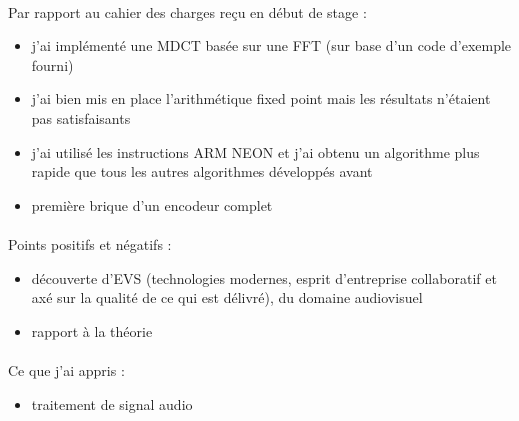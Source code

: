 \documentclass{article}
\begin{document}
    \paragraph{}
    Par rapport au cahier des charges reçu en début de stage :
    \begin{itemize}
        \item j'ai implémenté une MDCT basée sur une FFT (sur base d'un code d'exemple fourni)
        \item j'ai bien mis en place l'arithmétique fixed point mais les résultats n'étaient pas satisfaisants
        \item j'ai utilisé les instructions ARM NEON et j'ai obtenu un algorithme plus rapide que tous les autres algorithmes développés avant
        \item première brique d'un encodeur complet
    \end{itemize}

    \paragraph{}
    Points positifs et négatifs :
    \begin{itemize}
        \item découverte d'EVS (technologies modernes, esprit d'entreprise collaboratif et axé sur la qualité de ce qui est délivré), du domaine audiovisuel
        \item rapport à la théorie
    \end{itemize}

    \paragraph{}
    Ce que j'ai appris :
    \begin{itemize}
        \item traitement de signal audio
    \end{itemize}

    \newpage
    
    

    
\end{document}
